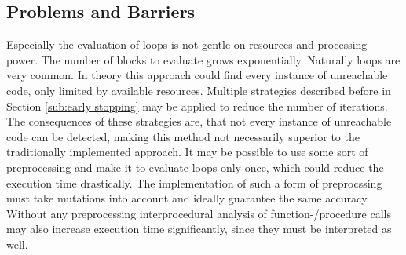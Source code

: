 \subsection{Problems and Barriers}
\label{sub:problems and barriers}
Especially the evaluation of loops is not gentle on resources and processing power. The number of blocks to evaluate grows exponentially. Naturally loops are very common. In theory this approach could find every instance of unreachable code, only limited by available resources. Multiple strategies described before in Section \ref{sub:early stopping} may be applied to reduce the number of iterations.
The consequences of these strategies are, that not every instance of unreachable code can be detected, making this method not necessarily superior to the traditionally implemented approach.
It may be possible to use some sort of preprocessing and make it to evaluate loops only once, which could reduce the execution time drastically.
The implementation of such a form of preprocssing must take mutations into account and ideally guarantee the same accuracy.
Without any preprocessing interprocedural analysis of function-/procedure calls may also increase execution time significantly, since they must be interpreted as well. 
